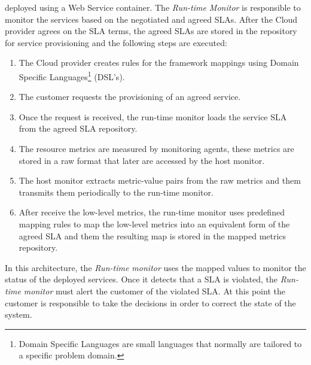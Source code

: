 deployed using a Web Service container. The \textit{Run-time Monitor} is responsible to monitor the services based on the negotiated and agreed SLAs. After the Cloud provider agrees on the SLA terms, the agreed SLAs are stored in the repository for
service provisioning and the following steps are executed:
\begin{enumerate}
  \item The Cloud provider creates rules for the framework mappings using Domain Specific Languages\footnote{Domain Specific Languages are small languages that normally are tailored to a specific problem domain.} (DSL's).
  \item The customer requests the provisioning of an agreed service.
  \item Once the request is received, the run-time monitor loads the service SLA from the agreed SLA repository.
  \item The resource metrics are measured by monitoring agents, these metrics are stored in a raw format that later are accessed by the host monitor.
  \item The host monitor extracts metric-value pairs from the raw metrics and them transmits them periodically to the run-time monitor.
  \item After receive the low-level metrics, the run-time monitor uses predefined mapping rules to map the low-level metrics into an equivalent form of the agreed SLA and them the resulting map is stored in the mapped metrics repository.
\end{enumerate}

In this architecture, the \textit{Run-time monitor} uses the mapped values to monitor the status of the deployed services. Once it detects that a SLA is violated, the \textit{Run-time monitor} must alert the customer of the violated SLA.
At this point the customer is responsible to take the decisions in order to correct the state of the system.
